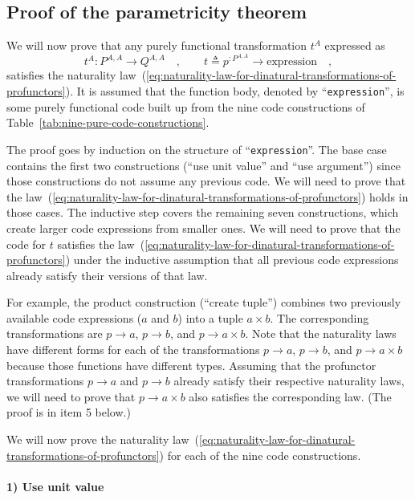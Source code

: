 \subsection{Proof of the parametricity theorem}

We will now prove that any purely functional transformation $t^{A}$
expressed as 
\[
t^{A}:P^{A,A}\rightarrow Q^{A,A}\quad,\quad\quad t\triangleq p^{:P^{A,A}}\rightarrow\text{expression}\quad,
\]
satisfies the naturality law~(\ref{eq:naturality-law-for-dinatural-transformations-of-profunctors}).
It is assumed that the function body, denoted by \textsf{``}\lstinline!expression!\textsf{''},
is some purely functional code built up from the nine code constructions
of Table~\ref{tab:nine-pure-code-constructions}.

The proof goes by induction on the structure of \textsf{``}\lstinline!expression!\textsf{''}.
The base case contains the first two constructions (\textsf{``}use unit value\textsf{''}
and \textsf{``}use argument\textsf{''}) since those constructions do not assume any
previous code. We will need to prove that the law~(\ref{eq:naturality-law-for-dinatural-transformations-of-profunctors})
holds in those cases. The inductive step covers the remaining seven
constructions, which create larger code expressions from smaller ones.
We will need to prove that the code for $t$ satisfies the law~(\ref{eq:naturality-law-for-dinatural-transformations-of-profunctors})
under the inductive assumption that all previous code expressions
already satisfy their versions of that law.

For example, the product construction (\textsf{``}create tuple\textsf{''}) combines
two previously available code expressions ($a$ and $b$) into a tuple
$a\times b$. The corresponding transformations are $p\rightarrow a$,
$p\rightarrow b$, and $p\rightarrow a\times b$. Note that the naturality
laws have different forms for each of the transformations $p\rightarrow a$,
$p\rightarrow b$, and $p\rightarrow a\times b$ because those functions
have different types. Assuming that the profunctor transformations
$p\rightarrow a$ and $p\rightarrow b$ already satisfy their respective
naturality laws, we will need to prove that $p\rightarrow a\times b$
also satisfies the corresponding law. (The proof is in item 5 below.)

We will now prove the naturality law~(\ref{eq:naturality-law-for-dinatural-transformations-of-profunctors})
for each of the nine code constructions.

\paragraph{1) Use unit value}

